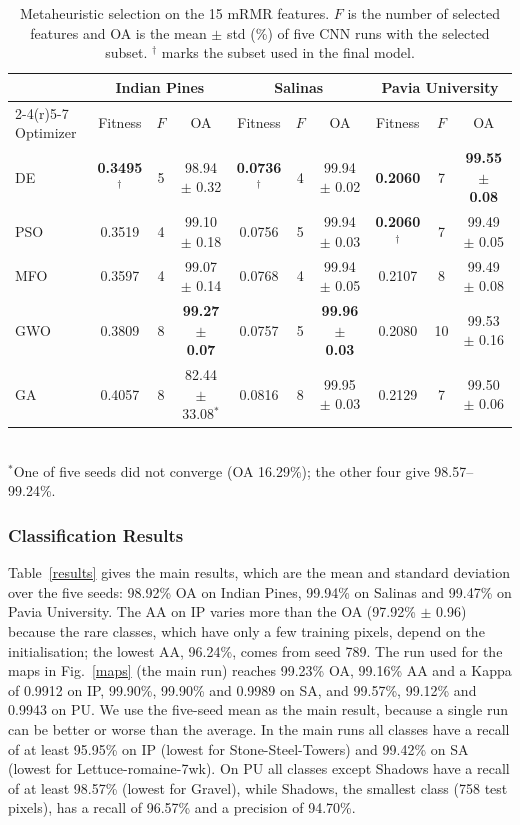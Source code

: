 \documentclass[conference]{IEEEtran}
\begin{document}
	\begin{table}[t]
		\centering
		\caption{Metaheuristic selection on the 15 mRMR features. $F$ is the number of selected features and OA is the mean $\pm$ std (\%) of five CNN runs with the selected subset. $^{\dagger}$ marks the subset used in the final model.}
		\label{metatable}
		\footnotesize
		\setlength{\tabcolsep}{4pt}
		\begin{tabular}{@{}lccc@{\hspace{14pt}}ccc@{\hspace{14pt}}ccc@{}}
			\toprule
			& \multicolumn{3}{c}{Indian Pines} & \multicolumn{3}{c}{Salinas} & \multicolumn{3}{c}{Pavia University} \\ \cmidrule(r){2-4}\cmidrule(r){5-7}\cmidrule{8-10}
			Optimizer & Fitness & $F$ & OA & Fitness & $F$ & OA & Fitness & $F$ & OA \\ \midrule
			DE  & \textbf{0.3495}$^{\dagger}$ & 5 & 98.94 $\pm$ 0.32 & \textbf{0.0736}$^{\dagger}$ & 4 & 99.94 $\pm$ 0.02 & \textbf{0.2060} & 7 & \textbf{99.55 $\pm$ 0.08} \\
			PSO & 0.3519 & 4 & 99.10 $\pm$ 0.18 & 0.0756 & 5 & 99.94 $\pm$ 0.03 & \textbf{0.2060}$^{\dagger}$ & 7 & 99.49 $\pm$ 0.05 \\
			MFO & 0.3597 & 4 & 99.07 $\pm$ 0.14 & 0.0768 & 4 & 99.94 $\pm$ 0.05 & 0.2107 & 8 & 99.49 $\pm$ 0.08 \\
			GWO & 0.3809 & 8 & \textbf{99.27 $\pm$ 0.07} & 0.0757 & 5 & \textbf{99.96 $\pm$ 0.03} & 0.2080 & 10 & 99.53 $\pm$ 0.16 \\
			GA  & 0.4057 & 8 & 82.44 $\pm$ 33.08$^{*}$ & 0.0816 & 8 & 99.95 $\pm$ 0.03 & 0.2129 & 7 & 99.50 $\pm$ 0.06 \\ \bottomrule
		\end{tabular}\\[3pt]
		{\scriptsize $^{*}$One of five seeds did not converge (OA 16.29\%); the other four give 98.57--99.24\%.}
	\end{table}
	
	\subsubsection{Classification Results}
	Table~\ref{results} gives the main results, which are the mean and standard deviation over the five seeds: 98.92\% OA on Indian Pines, 99.94\% on Salinas and 99.47\% on Pavia University. The AA on IP varies more than the OA (97.92\% $\pm$ 0.96) because the rare classes, which have only a few training pixels, depend on the initialisation; the lowest AA, 96.24\%, comes from seed 789. The run used for the maps in Fig.~\ref{maps} (the main run) reaches 99.23\% OA, 99.16\% AA and a Kappa of 0.9912 on IP, 99.90\%, 99.90\% and 0.9989 on SA, and 99.57\%, 99.12\% and 0.9943 on PU. We use the five-seed mean as the main result, because a single run can be better or worse than the average. In the main runs all classes have a recall of at least 95.95\% on IP (lowest for Stone-Steel-Towers) and 99.42\% on SA (lowest for Lettuce-romaine-7wk). On PU all classes except Shadows have a recall of at least 98.57\% (lowest for Gravel), while Shadows, the smallest class (758 test pixels), has a recall of 96.57\% and a precision of 94.70\%.
	
\end{document}
